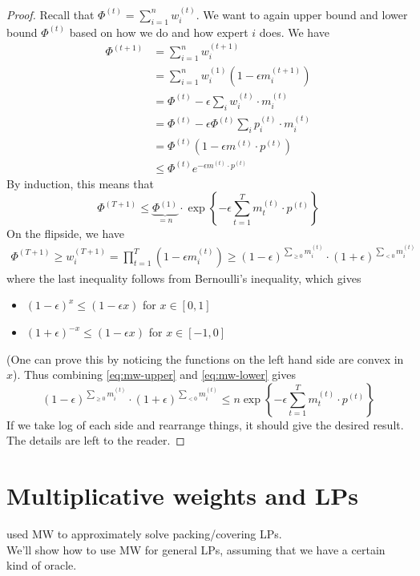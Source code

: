 \documentclass[11pt]{article}
\begin{document}
\begin{proof}
Recall that $\Phi^(t) = \sum_{i=1}^n w_i^{(t)}$. We want to again upper bound and lower bound $\Phi^(t)$ based on how we do and how expert $i$ does. We have
\begin{align}
\Phi^{(t+1)} &= \sum_{i=1}^n w_i^{(t+1)}\\
&=\sum_{i=1}^n w_i^{(1)}(1 - \epsilon m_i^{(t+1)})\\
&= \Phi^{(t)} - \epsilon\sum_i w_i^{(t)}\cdot m_i^{(t)}\\
&= \Phi^{(t)} - \epsilon\Phi^{(t)}\sum_i p_i^{(t)}\cdot m_i^{(t)}\\
&= \Phi^{(t)} (1-\epsilon m^{(t)}\cdot p^{(t)})\\
&\le \Phi^{(t)} e^{-\epsilon m^{(t)}\cdot p^{(t)}}
\end{align}
By induction, this means that 
\begin{equation}\label{eq:mw-upper}
\Phi^{(T+1)}\le \underbrace{\Phi^{(1)}}_{=n}\cdot \exp\left\{-\epsilon \displaystyle\sum_{t=1}^T m_t^{(t)} \cdot p^{(t)}\right\}
\end{equation}
On the flipside, we have
\begin{align}\label{eq:mw-lower}
\Phi^{(T+1)} \ge w_i^{(T+1)} = \prod_{t=1}^T (1-\epsilon m_i^{(t)})\ge (1-\epsilon)^{\underset{\ge 0}\sum m_i^{(t)}} \cdot (1+\epsilon)^{\underset{< 0}\sum m_i^{(t)}}
\end{align}
where the last inequality follows from Bernoulli's inequality, which gives
\begin{itemize}
\item $(1-\epsilon)^x \le (1-\epsilon x)$ for $x\in [0,1]$
\item $(1+\epsilon)^{-x} \le (1-\epsilon x)$ for $x\in [-1,0]$
\end{itemize}
(One can prove this by noticing the functions on the left hand side are convex in $x$). Thus combining \eqref{eq:mw-upper} and \eqref{eq:mw-lower} gives
\begin{equation}
(1-\epsilon)^{\underset{\ge 0}\sum m_i^{(t)}} \cdot (1+\epsilon)^{\underset{< 0}\sum m_i^{(t)}}\le n\exp\left\{-\epsilon \displaystyle\sum_{t=1}^T m_t^{(t)} \cdot p^{(t)}\right\}
\end{equation}
If we take log of each side and rearrange things, it should give the desired result. The details are left to the reader.
\end{proof}
\section{Multiplicative weights and LPs}
\cite{DBLP:conf/focs/PlotkinST91} used MW to approximately solve packing/covering LPs.\medskip\\
We'll show how to use MW for general LPs, assuming that we have a certain kind of oracle.
\end{document}
